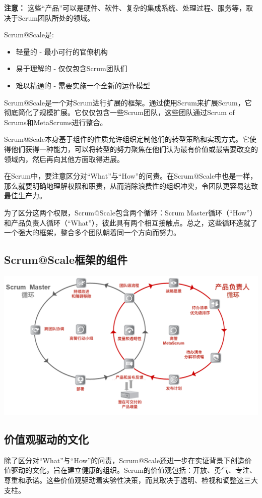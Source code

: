 \documentclass[12pt,a4paper,parskip=full]{scrartcl}
\begin{document}
\begin{CJK*}{UTF8}{gbsn}
\textbf{注意：} 这些“产品”可以是硬件、软件、复杂的集成系统、处理过程、服务等，取决于Scrum团队所处的领域。

Scrum@Scale是:
\begin{itemize}
\item 轻量的 - 最小可行的官僚机构
\item 易于理解的 - 仅仅包含Scrum团队们
\item 难以精通的 - 需要实施一个全新的运作模型
\end{itemize}

Scrum@Scale是一个对Scrum进行扩展的框架。通过使用Scrum来扩展Scrum，它彻底简化了规模扩展。它仅仅包含一些Scrum团队，这些团队通过Scrum of Scrums和MetaScrums进行整合。

Scrum@Scale本身基于组件的性质允许组织定制他们的转型策略和实现方式。它使得他们获得一种能力，可以将转型的努力聚焦在他们认为最有价值或最需要改变的领域内，然后再向其他方面取得进展。

在Scrum中，要注意区分对“What”与“How”的问责。在Scrum@Scale中也是一样，那么就要明确地理解权限和职责，从而消除浪费性的组织冲突，令团队更容易达致最佳生产力。

为了区分这两个权限，Scrum@Scale包含两个循环：Scrum Master循环（“How”）和产品负责人循环（“What”），彼此具有两个相互接触点。总之，这些循环造就了一个强大的框架，整合多个团队朝着同一个方向而努力。

\subsection{Scrum@Scale框架的组件}

\includegraphics[width=1.0\linewidth]{SMPO-Cycle.png}

\subsection{价值观驱动的文化}
除了区分对“What”与“How”的问责，Scrum@Scale还进一步在实证背景下创造价值驱动的文化，旨在建立健康的组织。Scrum的价值观包括：开放、勇气、专注、尊重和承诺。这些价值观驱动着实验性决策，而其取决于透明、检视和调整这三大支柱。


\end{CJK*}
\end{document}
